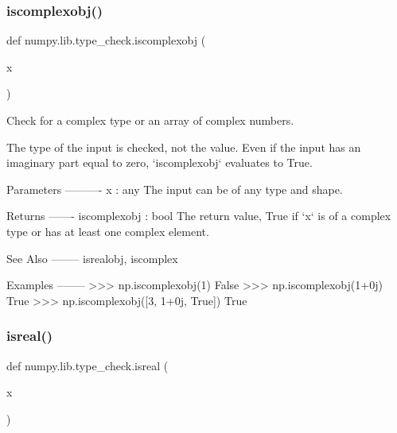 \subsubsection{\texorpdfstring{iscomplexobj()}{iscomplexobj()}}
{\footnotesize\ttfamily def numpy.\+lib.\+type\+\_\+check.\+iscomplexobj (\begin{DoxyParamCaption}\item[{}]{x }\end{DoxyParamCaption})}

\begin{DoxyVerb}Check for a complex type or an array of complex numbers.

The type of the input is checked, not the value. Even if the input
has an imaginary part equal to zero, `iscomplexobj` evaluates to True.

Parameters
----------
x : any
    The input can be of any type and shape.

Returns
-------
iscomplexobj : bool
    The return value, True if `x` is of a complex type or has at least
    one complex element.

See Also
--------
isrealobj, iscomplex

Examples
--------
>>> np.iscomplexobj(1)
False
>>> np.iscomplexobj(1+0j)
True
>>> np.iscomplexobj([3, 1+0j, True])
True\end{DoxyVerb}
 \mbox{\label{namespacenumpy_1_1lib_1_1type__check_aa38162fdf9ab6e0b32468d91f9adb913}} 
\subsubsection{\texorpdfstring{isreal()}{isreal()}}
{\footnotesize\ttfamily def numpy.\+lib.\+type\+\_\+check.\+isreal (\begin{DoxyParamCaption}\item[{}]{x }\end{DoxyParamCaption})}

